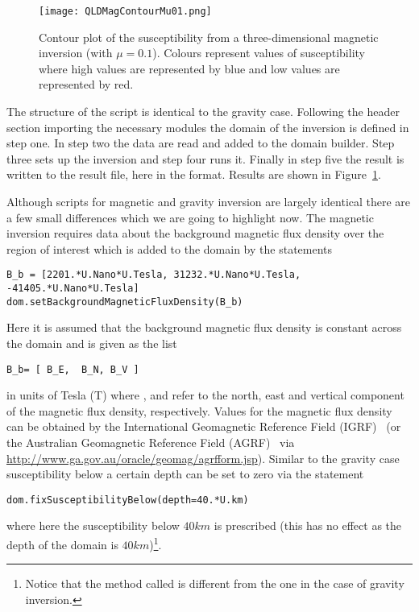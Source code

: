 \begin{figure}
\centering
\texttt{[image: QLDMagContourMu01.png]}
\caption{Contour plot of the susceptibility from a three-dimensional magnetic inversion (with $\mu=0.1$).
Colours represent values of susceptibility where high values are represented by
    blue and low values are represented by red.}
\label{FIG:P1:MAG:1}
\end{figure}

The structure of the script is identical to the gravity case.
Following the header section importing the necessary modules the domain of the
inversion is defined in step one.
In step two the data are read and added to the domain builder.
Step three sets up the inversion and step four runs it.
Finally in step five the result is written to the result file, here
 in the \VTK format.
Results are shown in Figure~\ref{FIG:P1:MAG:1}.

Although scripts for magnetic and gravity inversion are largely identical there
are a few small differences which we are going to highlight now.
The magnetic inversion requires data about the background magnetic flux density
over the region of interest which is added to the domain by the statements 
\begin{verbatim}
B_b = [2201.*U.Nano*U.Tesla, 31232.*U.Nano*U.Tesla,  -41405.*U.Nano*U.Tesla]
dom.setBackgroundMagneticFluxDensity(B_b)
\end{verbatim}
Here it is assumed that the background magnetic flux density is constant across
the domain and is given as the list
\begin{verbatim}
B_b= [ B_E,  B_N, B_V ]
\end{verbatim}
in units of Tesla (T) where 
,  and  refer to the north, east and
vertical component of the magnetic flux density, respectively.
Values for the magnetic flux density can be obtained by the International
Geomagnetic Reference Field (IGRF)~\cite{IGRF} (or the Australian Geomagnetic
Reference Field (AGRF)~\cite{AGRF} via \url{http://www.ga.gov.au/oracle/geomag/agrfform.jsp}).
Similar to the gravity case susceptibility below a certain depth can be set to
zero via the statement
\begin{verbatim}
dom.fixSusceptibilityBelow(depth=40.*U.km)
\end{verbatim}
where here the susceptibility below $40km$ is prescribed (this has no effect as
the depth of the domain is $40km$)\footnote{Notice that the method called is
different from the one in the case of gravity inversion.}. 

